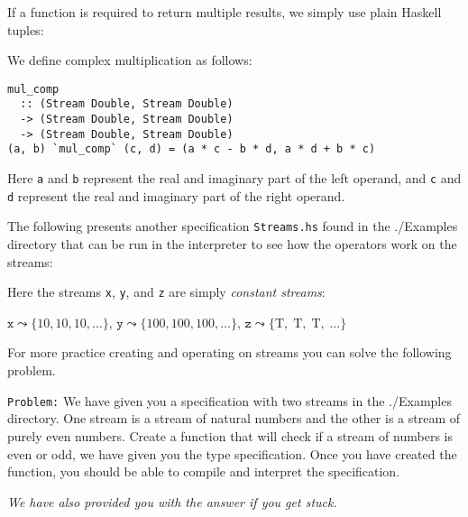 If a function is required to return multiple results, we simply use plain
Haskell tuples:

\begin{example}
We define complex multiplication as follows:
%
\begin{lstlisting}[language = Copilot, frame = single]
mul_comp
  :: (Stream Double, Stream Double)
  -> (Stream Double, Stream Double)
  -> (Stream Double, Stream Double)
(a, b) `mul_comp` (c, d) = (a * c - b * d, a * d + b * c)
\end{lstlisting}
%
Here {\tt a} and {\tt b} represent the real and imaginary part of the left
operand, and {\tt c} and {\tt d} represent the real and imaginary part
of the right operand.
\end{example}

The following  presents another specification \texttt{Streams.hs} found in the ./Examples directory
that can be run in the interpreter to see how the operators work on the streams:

\noindent




\noindent Here the streams {\tt x}, {\tt y}, and {\tt z} are simply
\emph{constant streams}:

\begin{center} $\mathtt{x} \leadsto \{10, 10, 10, \dots \}$, $\mathtt{y}
\leadsto \{100, 100, 100,  \dots \}$, $\mathtt{z} \leadsto \{\mbox{T},\;
\mbox{T},\; \mbox{T},\; \dots \}$ \end{center}

\noindent For more practice creating and operating on streams you can solve the
following problem. 


{\tt Problem:} We have given you a specification with two streams in the
./Examples directory.
%
One stream is a stream of natural numbers and the other is a stream of purely
even numbers.
%
Create a function that will check if a stream of numbers is even or odd, we
have given you the type specification.
%
Once you have created the function, you should be able to compile and interpret the
specification.
%

\emph{We have also provided you with the answer if you get stuck.}
%



